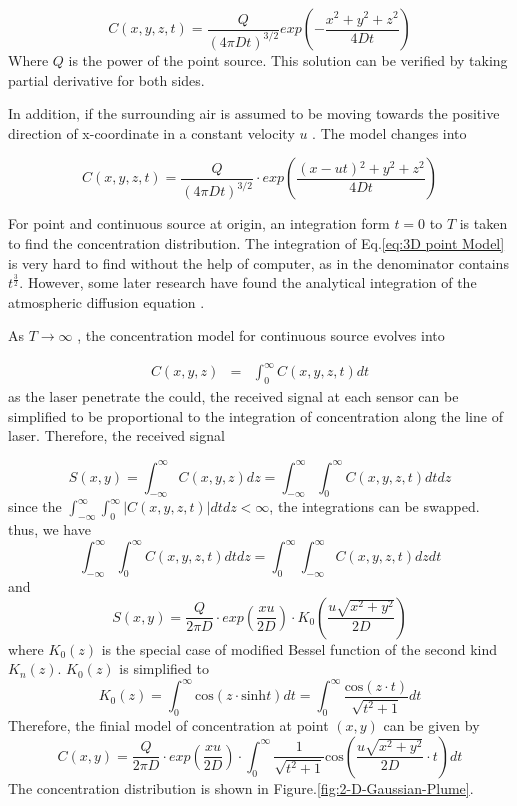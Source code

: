 \begin{equation}
C(x,y,z,t)=\frac{Q}{\left(4\pi Dt\right)^{3/2}}exp\left(-\frac{x{}^{2}+y^{2}+z^{2}}{4Dt}\right)
\end{equation}
Where $Q$ is the power of the point source. This solution can be
verified by taking partial derivative for both sides.

In addition, if the surrounding air is assumed to be moving towards
the positive direction of x-coordinate in a constant velocity $u$
. The model changes into

\begin{equation}
C(x,y,z,t)=\frac{Q}{\left(4\pi Dt\right)^{3/2}}\cdot exp\left(\frac{(x-ut){}^{2}+y^{2}+z^{2}}{4Dt}\right)\label{eq:3D point Model}
\end{equation}


For point and continuous source at origin, an integration form $t=0$
to $T$ is taken to find the concentration distribution. The integration
of Eq.\eqref{eq:3D point Model} is very hard to find without the
help of computer, as in the denominator contains $t^{\frac{3}{2}}$.
However, some later research have found the analytical integration
of the atmospheric diffusion equation \cite{Lin1996}. 

As $T\rightarrow\infty$ , the concentration model for continuous
source evolves into

\begin{eqnarray}
C(x,y,z) & = & \int_{0}^{\infty}C(x,y,z,t)dt
\end{eqnarray}
as the laser penetrate the could, the received signal at each sensor
can be simplified to be proportional to the integration of concentration
along the line of laser. Therefore, the received signal 

\[
S(x,y)=\int_{-\infty}^{\infty}C(x,y,z)dz=\int_{-\infty}^{\infty}\int_{0}^{\infty}C(x,y,z,t)dtdz
\]
since the $\int_{-\infty}^{\infty}\int_{0}^{\infty}\left|C(x,y,z,t)\right|dtdz<\infty$,
the integrations can be swapped. thus, we have 
\[
\int_{-\infty}^{\infty}\int_{0}^{\infty}C(x,y,z,t)dtdz=\int_{0}^{\infty}\int_{-\infty}^{\infty}C(x,y,z,t)dzdt
\]
and 
\[
S(x,y)=\frac{Q}{2\pi D}\cdot exp\left(\frac{xu}{2D}\right)\cdot K_{0}\left(\frac{u\sqrt{x^{2}+y^{2}}}{2D}\right)
\]
where $K_{0}(z)$ is the special case of modified Bessel function
of the second kind $K_{n}(z)$. $K_{0}(z)$ is simplified to 
\[
K_{0}(z)=\int_{0}^{\infty}\mbox{cos}(z\cdot\mbox{sinh}t)dt=\int_{0}^{\infty}\frac{\mbox{cos}(z\cdot t)}{\sqrt{t^{2}+1}}dt
\]
Therefore, the finial model of concentration at point $\left(x,y\right)$
can be given by 
\[
C(x,y)=\frac{Q}{2\pi D}\cdot exp\left(\frac{xu}{2D}\right)\cdot\int_{0}^{\infty}\frac{1}{\sqrt{t^{2}+1}}\mbox{cos}(\frac{u\sqrt{x^{2}+y^{2}}}{2D}\cdot t)dt
\]
The concentration distribution is shown in Figure.\ref{fig:2-D-Gaussian-Plume}.

